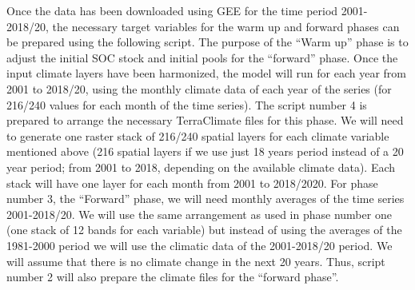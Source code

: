 \documentclass[
  10pt,
  b5paper,
]{book}
\begin{document}
Once the data has been downloaded using GEE for the time period 2001-2018/20, the necessary target variables for the warm up and forward phases can be prepared using the following script. The purpose of the ``Warm up'' phase is to adjust the initial SOC stock and initial pools for the ``forward'' phase. Once the input climate layers have been harmonized, the model will run for each year from 2001 to 2018/20, using the monthly climate data of each year of the series (for 216/240 values for each month of the time series). The script number 4 is prepared to arrange the necessary TerraClimate files for this phase. We will need to generate one raster stack of 216/240 spatial layers for each climate variable mentioned above (216 spatial layers if we use just 18 years period instead of a 20 year period; from 2001 to 2018, depending on the available climate data). Each stack will have one layer for each month from 2001 to 2018/2020. For phase number 3, the ``Forward'' phase, we will need monthly averages of the time series 2001-2018/20. We will use the same arrangement as used in phase number one (one stack of 12 bands for each variable) but instead of using the averages of the 1981-2000 period we will use the climatic data of the 2001-2018/20 period. We will assume that there is no climate change in the next 20 years. Thus, script number 2 will also prepare the climate files for the ``forward phase''.
\end{document}
